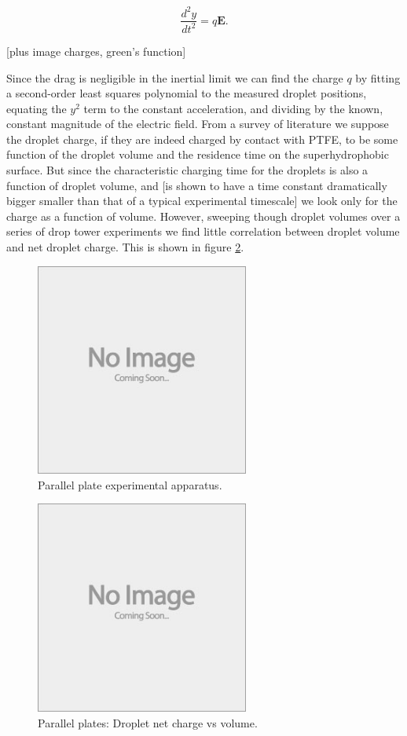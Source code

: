 \documentclass{jfm}
\begin{document}
\[ \frac{d^2y}{dt^2} = q\mathbf{E}. \]

[plus image charges, green's function]

Since the drag is negligible in the inertial limit we can find the charge $q$ by fitting a second-order least squares polynomial to the measured droplet positions, equating the $y^2$ term to the constant acceleration, and dividing by the known, constant magnitude of the electric field. From a survey of literature we suppose the droplet charge, if they are indeed charged by contact with PTFE, to be some function of the droplet volume and the residence time on the superhydrophobic surface. But since the characteristic charging time for the droplets is also a function of droplet volume, and [is shown to have a time constant dramatically bigger smaller than that of a typical experimental timescale] we look only for the charge as a function of volume. However, sweeping though droplet volumes over a series of drop tower experiments we find little correlation between droplet volume  and net droplet charge. This is shown in figure \ref{fig:drop_charge}.

\begin{figure}
  \centerline{\includegraphics[height=7cm,width=7cm]{e88_1_thumb.jpg}}
  \caption{Parallel plate experimental apparatus.}
\label{fig:millikan}
\end{figure} 

\begin{figure}
  \centerline{\includegraphics[height=7cm,width=7cm]{e88_1_thumb.jpg}}
  \caption{Parallel plates: Droplet net charge vs volume.}
\label{fig:drop_charge}
\end{figure}
\end{document}
